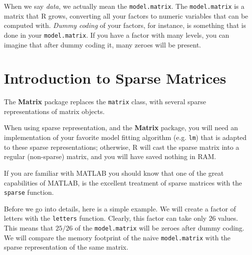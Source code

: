 \documentclass[]{book}
\newenvironment{Shaded}{\begin{snugshade}}{\end{snugshade}}
\newcommand{\CommentTok}[1]{\textcolor[rgb]{0.56,0.35,0.01}{\textit{#1}}}
\newcommand{\DataTypeTok}[1]{\textcolor[rgb]{0.13,0.29,0.53}{#1}}
\newcommand{\FloatTok}[1]{\textcolor[rgb]{0.00,0.00,0.81}{#1}}
\newcommand{\KeywordTok}[1]{\textcolor[rgb]{0.13,0.29,0.53}{\textbf{#1}}}
\newcommand{\NormalTok}[1]{#1}
\newcommand{\OperatorTok}[1]{\textcolor[rgb]{0.81,0.36,0.00}{\textbf{#1}}}
\newcommand{\OtherTok}[1]{\textcolor[rgb]{0.56,0.35,0.01}{#1}}
\newcommand{\StringTok}[1]{\textcolor[rgb]{0.31,0.60,0.02}{#1}}
\theoremstyle{definition}
\theoremstyle{definition}
\theoremstyle{definition}
\theoremstyle{remark}
\let\BeginKnitrBlock\begin \let\EndKnitrBlock\end
\begin{document}
When we say \emph{data}, we actually mean the \texttt{model.matrix}.
The \texttt{model.matrix} is a matrix that R grows, converting all your factors to numeric variables that can be computed with.
\emph{Dummy coding} of your factors, for instance, is something that is done in your \texttt{model.matrix}.
If you have a factor with many levels, you can imagine that after dummy coding it, many zeroes will be present.

\hypertarget{introduction-to-sparse-matrices}{%
\section{Introduction to Sparse Matrices}\label{introduction-to-sparse-matrices}}

The \textbf{Matrix} package replaces the \texttt{matrix} class, with several sparse representations of matrix objects.

When using sparse representation, and the \textbf{Matrix} package, you will need an implementation of your favorite model fitting algorithm (e.g. \texttt{lm}) that is adapted to these sparse representations; otherwise, R will cast the sparse matrix into a regular (non-sparse) matrix, and you will have saved nothing in RAM.

\BeginKnitrBlock{remark}
{}If you are familiar with MATLAB you should know that one of the great capabilities of MATLAB, is the excellent treatment of sparse matrices with the \texttt{sparse} function.
\EndKnitrBlock{remark}

Before we go into details, here is a simple example.
We will create a factor of letters with the \texttt{letters} function.
Clearly, this factor can take only \(26\) values.
This means that \(25/26\) of the \texttt{model.matrix} will be zeroes after dummy coding.
We will compare the memory footprint of the naive \texttt{model.matrix} with the sparse representation of the same matrix.

\begin{Shaded}
\end{Shaded}
\end{document}
